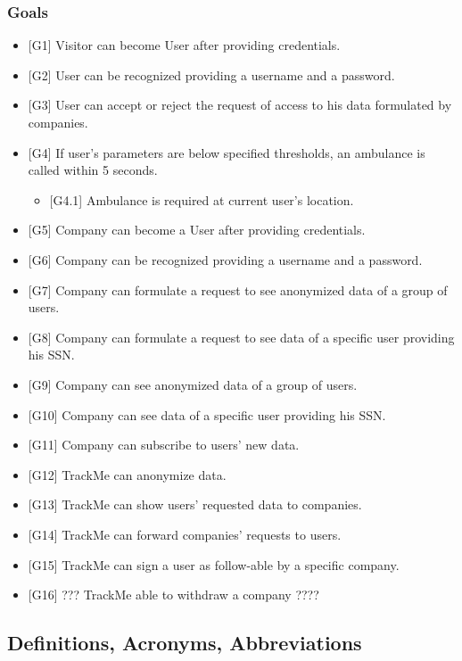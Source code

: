 \documentclass{article}
\begin{document}
\subsubsection{Goals}
\begin{itemize}
	\item {[G1]} Visitor can become User after providing credentials.
	\item {[G2]} User can be recognized providing a username and a password.
	\item {[G3]} User can accept or reject the request of access to his data formulated by companies.
	\item {[G4]} If user's parameters are below specified thresholds, an ambulance is called within 5 seconds. 
	\begin{itemize}
		\item {[G4.1]} Ambulance is required at current user's location. 
	\end{itemize}
	\item {[G5]} Company can become a User after providing credentials. 
	\item {[G6]} Company can be recognized providing a username and a password.
	\item {[G7]} Company can formulate a request to see anonymized data of a group of users.
	\item {[G8]} Company can formulate a request to see data of a specific user providing his SSN.
	\item {[G9]} Company can see anonymized data of a group of users.
	\item {[G10]} Company can see data of a specific user providing his SSN.
	\item {[G11]} Company can subscribe to users' new data.
	\item {[G12]} TrackMe can anonymize data.
	\item {[G13]} TrackMe can show users' requested data to companies.
	\item {[G14]} TrackMe can forward companies' requests to users. 
	\item {[G15]} TrackMe can sign a user as follow-able  by a specific company. 
	\item {[G16]} ??? TrackMe able to withdraw a company ????
\end{itemize} 
\subsection{Definitions, Acronyms, Abbreviations}
\end{document}
